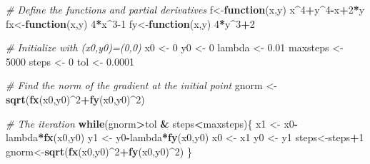 \documentclass[
]{book}
\newenvironment{Shaded}{\begin{snugshade}}{\end{snugshade}}
\newcommand{\CommentTok}[1]{\textcolor[rgb]{0.56,0.35,0.01}{\textit{#1}}}
\newcommand{\ControlFlowTok}[1]{\textcolor[rgb]{0.13,0.29,0.53}{\textbf{#1}}}
\newcommand{\DecValTok}[1]{\textcolor[rgb]{0.00,0.00,0.81}{#1}}
\newcommand{\FloatTok}[1]{\textcolor[rgb]{0.00,0.00,0.81}{#1}}
\newcommand{\FunctionTok}[1]{\textcolor[rgb]{0.13,0.29,0.53}{\textbf{#1}}}
\newcommand{\NormalTok}[1]{#1}
\newcommand{\OtherTok}[1]{\textcolor[rgb]{0.56,0.35,0.01}{#1}}
\newcommand{\SpecialCharTok}[1]{\textcolor[rgb]{0.81,0.36,0.00}{\textbf{#1}}}
\theoremstyle{definition}
\theoremstyle{definition}
\theoremstyle{definition}
\theoremstyle{definition}
\theoremstyle{remark}
\begin{document}
\begin{Shaded}
\begin{Highlighting}[]
\CommentTok{\# Define the functions and partial derivatives}
\NormalTok{f}\OtherTok{\textless{}{-}}\ControlFlowTok{function}\NormalTok{(x,y) x}\SpecialCharTok{\^{}}\DecValTok{4}\SpecialCharTok{+}\NormalTok{y}\SpecialCharTok{\^{}}\DecValTok{4}\SpecialCharTok{{-}}\NormalTok{x}\SpecialCharTok{+}\DecValTok{2}\SpecialCharTok{*}\NormalTok{y}
\NormalTok{fx}\OtherTok{\textless{}{-}}\ControlFlowTok{function}\NormalTok{(x,y) }\DecValTok{4}\SpecialCharTok{*}\NormalTok{x}\SpecialCharTok{\^{}}\DecValTok{3{-}1}
\NormalTok{fy}\OtherTok{\textless{}{-}}\ControlFlowTok{function}\NormalTok{(x,y) }\DecValTok{4}\SpecialCharTok{*}\NormalTok{y}\SpecialCharTok{\^{}}\DecValTok{3}\SpecialCharTok{+}\DecValTok{2}

\CommentTok{\# Initialize with (x0,y0)=(0,0)}
\NormalTok{x0 }\OtherTok{\textless{}{-}} \DecValTok{0}
\NormalTok{y0 }\OtherTok{\textless{}{-}} \DecValTok{0}
\NormalTok{lambda }\OtherTok{\textless{}{-}} \FloatTok{0.01}
\NormalTok{maxsteps }\OtherTok{\textless{}{-}} \DecValTok{5000}
\NormalTok{steps }\OtherTok{\textless{}{-}} \DecValTok{0}
\NormalTok{tol }\OtherTok{\textless{}{-}} \FloatTok{0.0001}

\CommentTok{\# Find the norm of the gradient at the initial point}
\NormalTok{gnorm }\OtherTok{\textless{}{-}} \FunctionTok{sqrt}\NormalTok{(}\FunctionTok{fx}\NormalTok{(x0,y0)}\SpecialCharTok{\^{}}\DecValTok{2}\SpecialCharTok{+}\FunctionTok{fy}\NormalTok{(x0,y0)}\SpecialCharTok{\^{}}\DecValTok{2}\NormalTok{)  }

\CommentTok{\# The iteration}
\ControlFlowTok{while}\NormalTok{(gnorm}\SpecialCharTok{\textgreater{}}\NormalTok{tol }\SpecialCharTok{\&}\NormalTok{ steps}\SpecialCharTok{\textless{}}\NormalTok{maxsteps)\{}
\NormalTok{  x1 }\OtherTok{\textless{}{-}}\NormalTok{ x0}\SpecialCharTok{{-}}\NormalTok{lambda}\SpecialCharTok{*}\FunctionTok{fx}\NormalTok{(x0,y0)}
\NormalTok{  y1 }\OtherTok{\textless{}{-}}\NormalTok{ y0}\SpecialCharTok{{-}}\NormalTok{lambda}\SpecialCharTok{*}\FunctionTok{fy}\NormalTok{(x0,y0)}
\NormalTok{  x0 }\OtherTok{\textless{}{-}}\NormalTok{ x1}
\NormalTok{  y0 }\OtherTok{\textless{}{-}}\NormalTok{ y1}
\NormalTok{  steps}\OtherTok{\textless{}{-}}\NormalTok{steps}\SpecialCharTok{+}\DecValTok{1}
\NormalTok{  gnorm}\OtherTok{\textless{}{-}}\FunctionTok{sqrt}\NormalTok{(}\FunctionTok{fx}\NormalTok{(x0,y0)}\SpecialCharTok{\^{}}\DecValTok{2}\SpecialCharTok{+}\FunctionTok{fy}\NormalTok{(x0,y0)}\SpecialCharTok{\^{}}\DecValTok{2}\NormalTok{)}
\NormalTok{\}}


\end{Highlighting}
\end{Shaded}
\end{document}
